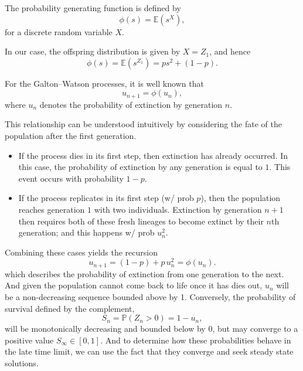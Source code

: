 \documentclass[11pt,a4paper]{article}
\theoremstyle{plain}
\theoremstyle{definition}
\begin{document}
\vspace{12pt}


\noindent
The probability generating function is defined by
\[
\phi(s) = \mathbb{E}(s^{X}),
\]
for a discrete random variable $X$.

In our case, the offspring distribution is given by $X = Z_1$, and hence
\[
\phi(s) = \mathbb{E}(s^{Z_1}) = p s^2 + (1-p).
\]


\noindent
For the Galton--Watson processes, it is well known that
\[
u_{n+1} = \phi(u_n),
\]
where $u_n$ denotes the probability of extinction by generation $n$.

This relationship can be understood intuitively by considering the fate of the
population after the first generation.

\begin{itemize}
    \item If the process dies in its first step, then extinction has already
    occurred. In this case, the probability of extinction by any generation is
    equal to $1$. This event occurs with probability $1-p$.
    \item If the process replicates in its first step (w/ prob $p$), then the population
    reaches generation $1$ with two individuals. Extinction by generation $n+1$
    then requires both of these fresh lineages to become extinct by their $n$th generation; and this happens w/ prob $u_n^2$.
\end{itemize}

\noindent
Combining these cases yields the recursion
\[
u_{n+1} = (1-p) + p\, u_n^2 = \phi(u_n).
\]
which describes the probability of extinction from one generation to the next. And given the population cannot come 
back to life once it has dies out, $u_n$ will be a non-decreasing sequence bounded above by 1. Conversely, the probability of survival
defined by the complement, $$ S_n = \mathbb{P}(Z_n > 0)  = 1-u_n,$$ will be monotonically decreasing and bounded below by 0, but may converge to a positive value $S_\infty \in [0,1]$.
And to determine how these probabilities behave in the late time limit, we can use the fact that they converge and seek steady state solutions.
\end{document}
